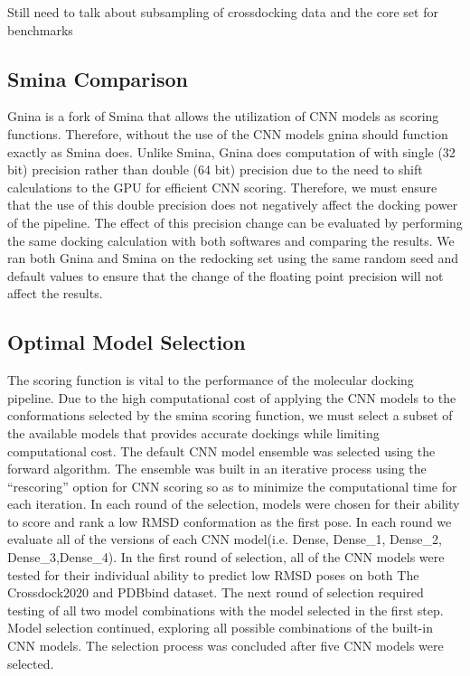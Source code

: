 \documentclass[journal=jcisd8,manuscript=article]{achemso}
\begin{document}
Still need to talk about subsampling of crossdocking data and the core set for benchmarks

\subsection{Smina Comparison}
Gnina is a fork of Smina that allows the utilization of CNN models as scoring functions. Therefore, without the use of the CNN models gnina should function exactly as Smina does. Unlike Smina, Gnina does computation of with single (32 bit) precision rather than double (64 bit) precision due to the need to shift calculations to the GPU for efficient CNN scoring. Therefore, we must ensure that the use of this double precision does not negatively affect the docking power of the pipeline. The effect of this precision change can be evaluated by performing the same docking calculation with both softwares and comparing the results. We ran both Gnina and Smina on the redocking set using the same random seed and default values to ensure that the change of the floating point precision will not affect the results. 

\subsection{Optimal Model Selection}
The scoring function is vital to the performance of the molecular docking pipeline. Due to the high computational cost of applying the CNN models to the conformations selected by the smina scoring function, we must select a subset of the available models that provides accurate dockings while limiting computational cost. The default CNN model ensemble was selected using the forward algorithm. The ensemble was built in an iterative process using the ``rescoring'' option for CNN scoring so as to minimize the computational time for each iteration. In each round of the selection, models were chosen for their ability to score and rank a low RMSD conformation as the first pose. In each round we evaluate all of the versions of each CNN model(i.e. Dense, Dense\_1, Dense\_2, Dense\_3,Dense\_4). In the first round of selection, all of the CNN models were tested for their individual ability to predict low RMSD poses on both The Crossdock2020 and PDBbind dataset. The next round of selection required testing of all two model combinations with the model selected in the first step. Model selection continued, exploring all possible combinations of the built-in CNN models. The selection process was concluded after five CNN models were selected.
\end{document}
